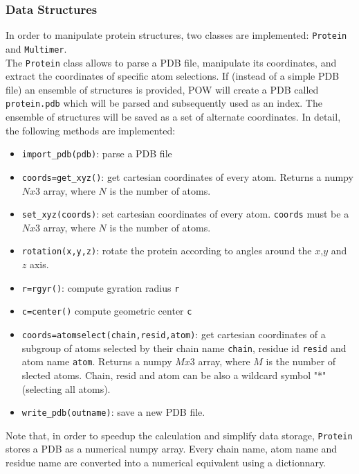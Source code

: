 \documentclass[a4paper, 12pt]{article}
\begin{document}
\subsubsection{Data Structures \label{symmdata}}

In order to manipulate protein structures, two classes are implemented: \texttt{Protein} and \texttt{Multimer}.\\

The \texttt{Protein} class allows to parse a PDB file, manipulate its coordinates, and extract the coordinates of specific atom selections. If (instead of a simple PDB file) an ensemble of structures is provided, POW will create a PDB called \texttt{protein.pdb} which will be parsed and subsequently used as an index. The ensemble of structures will be saved as a set of alternate coordinates. In detail, the following methods are implemented:

\begin{itemize}
\item \texttt{import\_pdb(pdb)}: parse a PDB file
\item \texttt{coords=get\_xyz()}: get cartesian coordinates of every atom. Returns a numpy $Nx3$ array, where $N$ is the number of atoms.
\item \texttt{set\_xyz(coords)}: set cartesian coordinates of every atom. \texttt{coords} must be a $Nx3$ array, where $N$ is the number of atoms.
\item \texttt{rotation(x,y,z)}: rotate the protein according to angles around the $x$,$y$ and $z$ axis.
\item \texttt{r=rgyr()}: compute gyration radius \texttt{r}
\item \texttt{c=center()} compute geometric center \texttt{c}
\item \texttt{coords=atomselect(chain,resid,atom)}: get cartesian coordinates of a subgroup of atoms selected by their chain name \texttt{chain}, residue id \texttt{resid} and atom name \texttt{atom}. Returns a numpy $Mx3$ array, where $M$ is the number of slected atoms. Chain, resid and atom can be also a wildcard symbol "*" (selecting all atoms). 
\item \texttt{write\_pdb(outname)}: save a new PDB file.
\end{itemize}

Note that, in order to speedup the calculation and simplify data storage, \texttt{Protein} stores a PDB as a numerical numpy array. Every chain name, atom name and residue name are converted into a numerical equivalent using a dictionnary.\\
\end{document}

